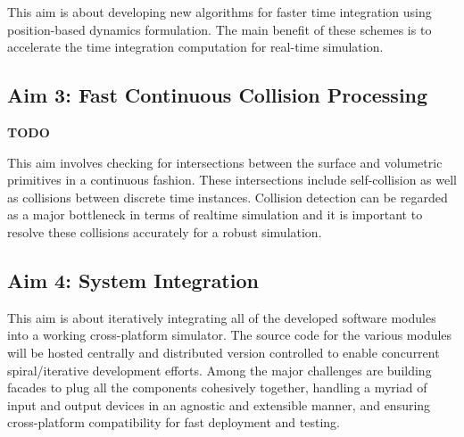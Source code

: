 This aim is about developing new algorithms for faster time integration using position-based dynamics formulation. The main benefit of these schemes is to accelerate the time integration computation for real-time simulation.

\subsection{Aim 3: Fast Continuous Collision Processing}

\textbf{TODO}

This aim involves checking for intersections between the surface and volumetric primitives in a continuous fashion. These intersections include self-collision as well as collisions between discrete time instances. Collision detection can be regarded as a major bottleneck in terms of realtime simulation and it is important to resolve these collisions accurately for a robust simulation.

\subsection{Aim 4: System Integration}

This aim is about iteratively integrating all of the developed software modules into a working cross-platform simulator. The source code for the various modules will be hosted centrally and distributed version controlled to enable concurrent spiral/iterative development efforts. Among the major challenges are building facades to plug all the components cohesively together, handling a myriad of input and output devices in an agnostic and extensible manner, and ensuring cross-platform compatibility for fast deployment and testing.

